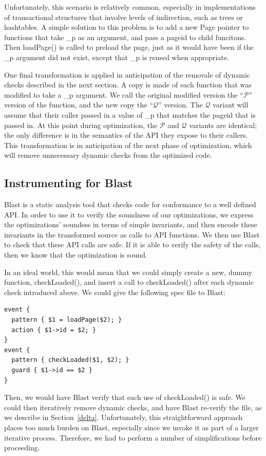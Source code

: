 \documentclass[10pt,letterpaper,twocolumn,english]{article}
\newcommand{\pin}{loadPage()\xspace}
\newcommand{\checkpage}{checkLoaded()\xspace}
\newcommand{\PP}{\_p\xspace}
\newcommand{\fP}{{$\mathcal P$}\xspace}
\newcommand{\fQ}{{$\mathcal Q$}\xspace}
\begin{document}
Unfortunately, this scenario is relatively common, especially in
implementations of transactional structures that involve levels of
indirection, such as trees or hashtables.  A simple solution to this
problem is to add a new Page pointer to functions that take \PP as an
argument, and pass a pageid to child funcitons.  Then \pin is called
to preload the page, just as it would have been if the \PP argument
did not exist, except that \PP is reused when appropriate.

One final transformation is applied in anticipation of the removale of
dynamic checks described in the next section.  A copy is made of each
function that was modified to take a \PP argument.  We call the
original modified version the ``\fP'' version of the function, and the
new copy the ``\fQ'' version.  The \fQ variant will assume that their caller
passed in a value of \PP that matches the pageid that is passed in.
At this point during optimization, the \fP and \fQ variants are
identical; the only difference is in the semantics of the API they
expose to their callers.  This transformation is in anticipation of
the next phase of optimization, which will remove unnecessary dynamic
checks from the optimized code.

\subsection{Instrumenting for Blast}
\label{instrumenting}
Blast is a static analysis tool that checks code for conformance to a
well defined API.  In order to use it to verify the soundness of our
optimizations, we express the optimizations' soundess in terms of
simple invariants, and then encode these invariants in the transformed
source as calls to API functions.  We then use Blast to check that
these API calls are safe.  If it is able to verify the safety of the
calls, then we know that the optimization is sound.  

In an ideal world, this would mean that we could simply create a new,
dummy function, \checkpage, and insert a call to \checkpage
after each dynamic check introduced above.  We could give the
following spec file to Blast:

\begin{verbatim}
event { 
  pattern { $1 = loadPage($2); }
  action { $1->id = $2; }
}
event { 
  pattern { checkLoaded($1, $2); }  
  guard { $1->id == $2 }
}
\end{verbatim}

Then, we would have Blast verify that each use of \checkpage is safe.
We could then iteratively remove dynamic checks, and have Blast
re-verify the file, as we describe in Section~\ref{delta}.
Unfortunately, this straightforward approach places too much burden on
Blast, especially since we invoke it as part of a larger iterative
process.  Therefore, we had to perform a number of simplifications
before proceeding.
\end{document}
